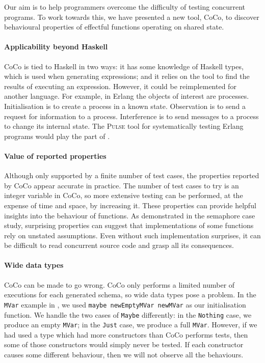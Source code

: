 Our aim is to help programmers overcome the difficulty of testing
concurrent programs.  To work towards this, we have presented a new
tool, CoCo, to discover behavioural properties of effectful functions
operating on shared state.

\paragraph{Applicability beyond Haskell}
CoCo is tied to Haskell in two ways: it has some knowledge of Haskell
types, which is used when generating expressions; and it relies on the
\dejafu{} tool to find the results of executing an expression.
However, it could be reimplemented for another language.  For example,
in Erlang the objects of interest are processes.  Initialisation is to
create a process in a known state.  Observation is to send a request
for information to a process.  Interference is to send messages to a
process to change its internal state.  The \textsc{Pulse} tool for
systematically testing Erlang programs \parencite{claessen2009} would play
the part of \dejafu{}.

\paragraph{Value of reported properties}
Although only supported by a finite number of test cases, the
properties reported by CoCo appear accurate in practice.  The number
of test cases to try is an integer variable in CoCo, so more extensive
testing can be performed, at the expense of time and space, by
increasing it.  These properties can provide helpful insights into the
behaviour of functions.  As demonstrated in the semaphore case study,
surprising properties can suggest that implementations of some
functions rely on unstated assumptions.  Even without such
implementation surprises, it can be difficult to read concurrent
source code and grasp all its consequences.

\paragraph{Wide data types}
CoCo can be made to go wrong.  CoCo only performs a limited number of
executions for each generated schema, so wide data types pose a
problem.  In the \verb|MVar| example in , we
used \verb|maybe newEmptyMVar newMVar| as our initialisation function.
We handle the two cases of \verb|Maybe| differently: in the
\verb|Nothing| case, we produce an empty \verb|MVar|; in the
\verb|Just| case, we produce a full \verb|MVar|.  However, if we had
used a type which had more constructors than CoCo performs tests, then
some of those constructors would simply never be tested.  If each
constructor causes some different behaviour, then we will not observe
all the behaviours.

